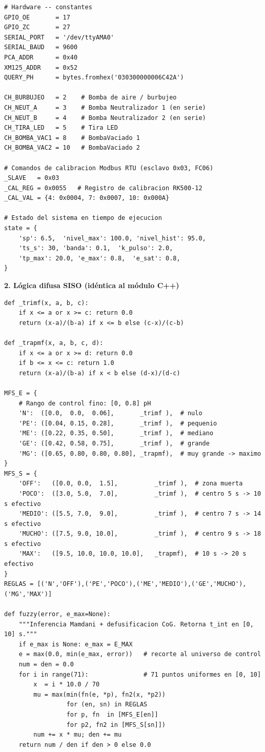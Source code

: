 \begin{lstlisting}
# Hardware -- constantes
GPIO_OE       = 17
GPIO_ZC       = 27
SERIAL_PORT   = '/dev/ttyAMA0'
SERIAL_BAUD   = 9600
PCA_ADDR      = 0x40
XM125_ADDR    = 0x52
QUERY_PH      = bytes.fromhex('030300000006C42A')

CH_BURBUJEO   = 2    # Bomba de aire / burbujeo
CH_NEUT_A     = 3    # Bomba Neutralizador 1 (en serie)
CH_NEUT_B     = 4    # Bomba Neutralizador 2 (en serie)
CH_TIRA_LED   = 5    # Tira LED
CH_BOMBA_VAC1 = 8    # BombaVaciado 1
CH_BOMBA_VAC2 = 10   # BombaVaciado 2

# Comandos de calibracion Modbus RTU (esclavo 0x03, FC06)
_SLAVE   = 0x03
_CAL_REG = 0x0055   # Registro de calibracion RK500-12
_CAL_VAL = {4: 0x0004, 7: 0x0007, 10: 0x000A}

# Estado del sistema en tiempo de ejecucion
state = {
    'sp': 6.5,  'nivel_max': 100.0, 'nivel_hist': 95.0,
    'ts_s': 30, 'banda': 0.1,  'k_pulso': 2.0,
    'tp_max': 20.0, 'e_max': 0.8,  'e_sat': 0.8,
}
\end{lstlisting}

\bigskip
\noindent\textbf{2. Lógica difusa SISO (idéntica al módulo C++)}

\begin{lstlisting}
def _trimf(x, a, b, c):
    if x <= a or x >= c: return 0.0
    return (x-a)/(b-a) if x <= b else (c-x)/(c-b)

def _trapmf(x, a, b, c, d):
    if x <= a or x >= d: return 0.0
    if b <= x <= c: return 1.0
    return (x-a)/(b-a) if x < b else (d-x)/(d-c)

MFS_E = {
    # Rango de control fino: [0, 0.8] pH
    'N':  ([0.0,  0.0,  0.06],       _trimf ),  # nulo
    'PE': ([0.04, 0.15, 0.28],       _trimf ),  # pequenio
    'ME': ([0.22, 0.35, 0.50],       _trimf ),  # mediano
    'GE': ([0.42, 0.58, 0.75],       _trimf ),  # grande
    'MG': ([0.65, 0.80, 0.80, 0.80], _trapmf),  # muy grande -> maximo
}
MFS_S = {
    'OFF':   ([0.0, 0.0,  1.5],          _trimf ),  # zona muerta
    'POCO':  ([3.0, 5.0,  7.0],          _trimf ),  # centro 5 s -> 10 s efectivo
    'MEDIO': ([5.5, 7.0,  9.0],          _trimf ),  # centro 7 s -> 14 s efectivo
    'MUCHO': ([7.5, 9.0, 10.0],          _trimf ),  # centro 9 s -> 18 s efectivo
    'MAX':   ([9.5, 10.0, 10.0, 10.0],   _trapmf),  # 10 s -> 20 s efectivo
}
REGLAS = [('N','OFF'),('PE','POCO'),('ME','MEDIO'),('GE','MUCHO'),('MG','MAX')]

def fuzzy(error, e_max=None):
    """Inferencia Mamdani + defusificacion CoG. Retorna t_int en [0, 10] s."""
    if e_max is None: e_max = E_MAX
    e = max(0.0, min(e_max, error))   # recorte al universo de control
    num = den = 0.0
    for i in range(71):               # 71 puntos uniformes en [0, 10]
        x  = i * 10.0 / 70
        mu = max(min(fn(e, *p), fn2(x, *p2))
                 for (en, sn) in REGLAS
                 for p, fn  in [MFS_E[en]]
                 for p2, fn2 in [MFS_S[sn]])
        num += x * mu; den += mu
    return num / den if den > 0 else 0.0
\end{lstlisting}

